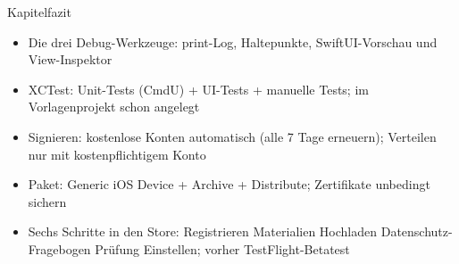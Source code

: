 \begin{tcbsummary}{Kapitelfazit}
\begin{itemize}
  \item Die drei Debug-Werkzeuge: print-Log, Haltepunkte, SwiftUI-Vorschau und View-Inspektor
  \item XCTest: Unit-Tests (CmdU) + UI-Tests + manuelle Tests; im Vorlagenprojekt schon angelegt
  \item Signieren: kostenlose Konten automatisch (alle 7 Tage erneuern); Verteilen nur mit kostenpflichtigem Konto
  \item Paket: Generic iOS Device + Archive + Distribute; Zertifikate unbedingt sichern
  \item Sechs Schritte in den Store: Registrieren Materialien Hochladen Datenschutz-Fragebogen Prüfung Einstellen; vorher TestFlight-Betatest
\end{itemize}

\end{tcbsummary}
